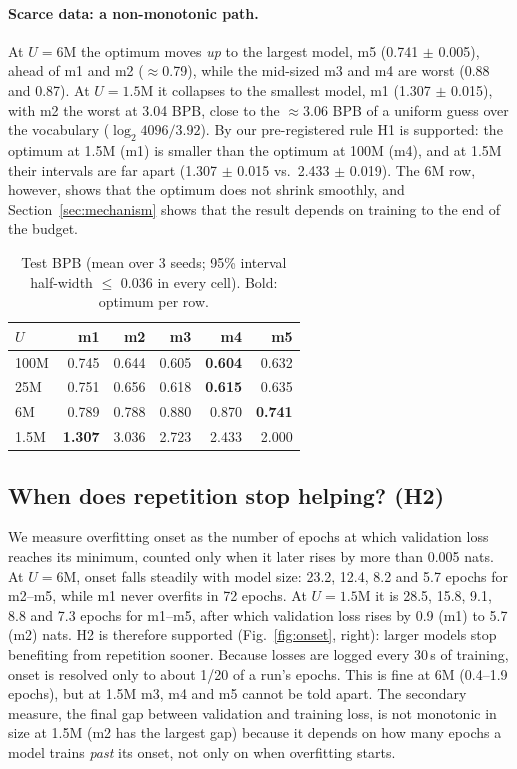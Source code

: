 \documentclass[11pt]{article}
\begin{document}
\paragraph{Scarce data: a non-monotonic path.}
At $U=6$M the optimum moves \emph{up} to the largest model, m5 (0.741 $\pm$ 0.005), ahead of m1 and m2
($\approx$0.79), while the mid-sized m3 and m4 are worst (0.88 and 0.87). At $U=1.5$M it collapses to the
smallest model, m1 (1.307 $\pm$ 0.015), with m2 the worst at 3.04 BPB, close to the $\approx$3.06 BPB of a
uniform guess over the vocabulary ($\log_2 4096 / 3.92$). By our pre-registered rule H1 is supported: the
optimum at 1.5M (m1) is smaller than the optimum at 100M (m4), and at 1.5M their intervals are far apart
(1.307 $\pm$ 0.015 vs.\ 2.433 $\pm$ 0.019). The 6M row, however, shows that the optimum does not shrink
smoothly, and Section~\ref{sec:mechanism} shows that the result depends on training to the end of the budget.

\begin{table}[h]\centering\small
\caption{Test BPB (mean over 3 seeds; 95\% interval half-width $\le$ 0.036 in every cell). Bold: optimum per row.}
\label{tab:main}
\begin{tabular}{lrrrrr}\toprule
$U$ & m1 & m2 & m3 & m4 & m5\\\midrule
100M & 0.745 & 0.644 & 0.605 & \textbf{0.604} & 0.632\\
25M  & 0.751 & 0.656 & 0.618 & \textbf{0.615} & 0.635\\
6M   & 0.789 & 0.788 & 0.880 & 0.870 & \textbf{0.741}\\
1.5M & \textbf{1.307} & 3.036 & 2.723 & 2.433 & 2.000\\\bottomrule
\end{tabular}\end{table}

\subsection{When does repetition stop helping? (H2)}

We measure overfitting onset as the number of epochs at which validation loss reaches its minimum, counted
only when it later rises by more than 0.005 nats. At $U=6$M, onset falls steadily with model size: 23.2, 12.4,
8.2 and 5.7 epochs for m2--m5, while m1 never overfits in 72 epochs. At $U=1.5$M it is 28.5, 15.8, 9.1, 8.8 and
7.3 epochs for m1--m5, after which validation loss rises by 0.9 (m1) to 5.7 (m2) nats. H2 is therefore
supported (Fig.~\ref{fig:onset}, right): larger models stop benefiting from repetition sooner. Because losses are 
logged every 30\,s of training, onset is resolved only to about 1/20 of a run's epochs. This is fine at 6M 
(0.4--1.9 epochs), but at 1.5M m3, m4 and m5 cannot be told apart. The secondary measure, the final gap between 
validation and training loss, is not monotonic in size at 1.5M (m2 has the largest gap) because it depends on 
how many epochs a model trains \emph{past} its onset, not only on when overfitting starts.
\end{document}
